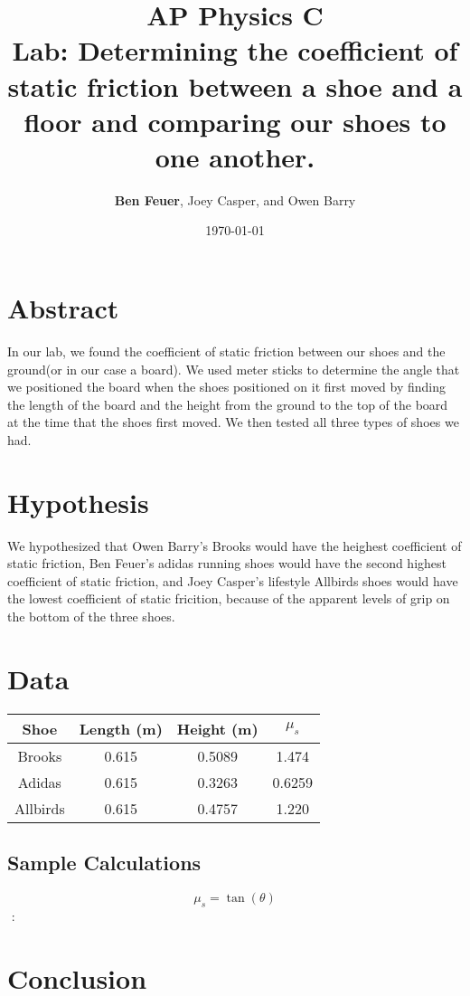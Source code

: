 \documentclass{report}
\title{\Huge{AP Physics C}\\Lab: Determining the coefficient of static friction between a shoe and a floor and comparing our shoes to one another.}
\author{\huge{\textbf{Ben Feuer}, Joey Casper, and Owen Barry}}
\date{\today}
\begin{document}
\maketitle
\newpage%
\pagebreak

\section*{Abstract}
In our lab, we found the coefficient of static friction between our shoes and the ground(or in our case a board). We used meter sticks to determine the angle that we positioned the board when the shoes positioned on it first moved by finding the length of the board and the height from the ground to the top of the board at the time that the shoes first moved. We then tested all three types of shoes we had.

\section*{Hypothesis}
We hypothesized that Owen Barry's Brooks would have the heighest coefficient of static friction, Ben Feuer's adidas running shoes would have the second highest coefficient of static friction, and Joey Casper's lifestyle Allbirds shoes would have the lowest coefficient of static fricition, because of the apparent levels of grip on the bottom of the three shoes.

\section*{Data}

\begin{center}
\begin{tabular}{ |c|c|c|c| } 
 \hline
 Shoe & Length (m) & Height (m) & $ \mu_s $ \\
 \hline
 Brooks & 0.615 & 0.5089 & 1.474 \\ 
 \hline
 Adidas & 0.615 & 0.3263 & 0.6259 \\ 
 \hline
 Allbirds & 0.615 & 0.4757 & 1.220 \\ 
 \hline
\end{tabular}
\end{center}

\subsection*{Sample Calculations}

$$ \mu_s = \tan(\theta) $$ 
$$ :\While{}
  \State 
\EndWhile

\section*{Conclusion}
\end{document}
